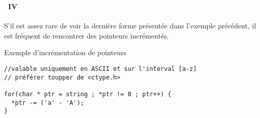 \begin{frame}[containsverbatim]
  \frametitle{\secname}
  \framesubtitle{\subsecname~IV}
  
  S'il est assez rare de voir la dernière forme présentée dans l'exemple précédent, il est fréquent de rencontrer des pointeurs incrémentés.
  
  \begin{exampleblock}{Exemple d'incrémentation de pointeurs}
    \begin{verbatim}
//valable uniquement en ASCII et sur l'interval [a-z]
// préférer toupper de <ctype.h>

for(char * ptr = string ; *ptr != 0 ; ptr++) {
  *ptr -= ('a' - 'A'); 
}\end{verbatim}
  \end{exampleblock}
\end{frame}

